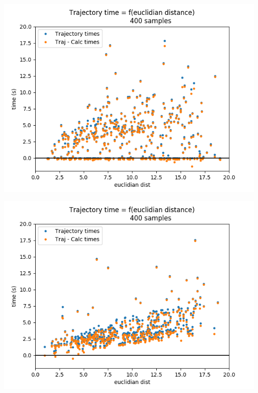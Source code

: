 \documentclass[a4paper,12pt]{report}
\begin{document}
\vspace{0.5cm}

\begin{minipage}[b]{0.45\textwidth}
	\begin{center}
		\includegraphics[width=1\linewidth]{images/traj_f(euclid)_noinit.png}
		\label{fig:calc_f(euclid)_noinit}
	\end{center}
\end{minipage}
\begin{minipage}[b]{0.45\textwidth}
	\begin{center}
		\includegraphics[width=1\linewidth]{images/traj_f(euclid)_init.png}
		\label{fig:calc_f(euclid)_init}
	\end{center}
\end{minipage}
\end{document}
